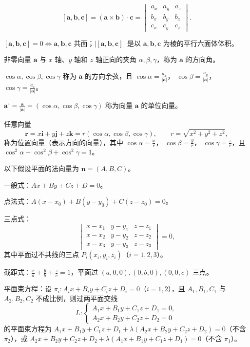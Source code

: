
\[
[\bm a,\bm b,\bm c]=(\bm a\times\bm b)\cdot\bm c
=\begin{vmatrix}
a_x&a_y&a_z\\
b_x&b_y&b_z\\
c_x&c_y&c_z
\end{vmatrix}.
\]

 $[\bm a,\bm b,\bm c]=0\Longleftrightarrow\bm a,\bm b,\bm c$ 共面；$|[\bm a,\bm b,\bm c]|$ 是以 $\bm a,\bm b,\bm c$ 为棱的平行六面体体积。


 非零向量 $\bm a$ 与 $x$ 轴、$y$ 轴和 $z$ 轴正向的夹角 $\alpha,\beta,\gamma$，称为 $\bm a$ 的方向角。

 $\cos\alpha,\cos\beta,\cos\gamma$ 称为 $\bm a$ 的方向余弦，且
$\displaystyle \cos\alpha=\frac{a_x}{|\bm a|}$，
$\displaystyle \cos\beta=\frac{a_y}{|\bm a|}$，
$\displaystyle \cos\gamma=\frac{a_z}{|\bm a|}$。

 $\displaystyle \bm a^\circ=\frac{\bm a}{|\bm a|}
=(\cos\alpha,\cos\beta,\cos\gamma)$ 称为向量 $\bm a$ 的单位向量。

 任意向量
\[
\bm r=x\bm i+y\bm j+z\bm k
=r(\cos\alpha,\cos\beta,\cos\gamma),
\qquad r=\sqrt{x^2+y^2+z^2},
\]
称为位置向量（表示方向的向量），其中
$\displaystyle \cos\alpha=\frac{x}{r}$，
$\displaystyle \cos\beta=\frac{y}{r}$，
$\displaystyle \cos\gamma=\frac{z}{r}$，且
$\cos^2\alpha+\cos^2\beta+\cos^2\gamma=1$。



以下假设平面的法向量为 $\bm n=(A,B,C)$。

 一般式：$Ax+By+Cz+D=0$。

 点法式：$A(x-x_0)+B(y-y_0)+C(z-z_0)=0$。

 三点式：
\[
\begin{vmatrix}
x-x_1&y-y_1&z-z_1\\
x-x_2&y-y_2&z-z_2\\
x-x_3&y-y_3&z-z_3
\end{vmatrix}=0,
\]
其中平面过不共线的三点 $P_i(x_i,y_i,z_i)$（$i=1,2,3$）。

 截距式：$\displaystyle \frac{x}{a}+\frac{y}{b}+\frac{z}{c}=1$，平面过 $(a,0,0),(0,b,0),(0,0,c)$ 三点。

 平面束方程：设
$\pi_i:A_ix+B_iy+C_iz+D_i=0$（$i=1,2$），且
$A_1,B_1,C_1$ 与 $A_2,B_2,C_2$ 不成比例，则过两平面交线
\[
L:\begin{cases}
A_1x+B_1y+C_1z+D_1=0,\\
A_2x+B_2y+C_2z+D_2=0
\end{cases}
\]
的平面束方程为
$A_1x+B_1y+C_1z+D_1+\lambda(A_2x+B_2y+C_2z+D_2)=0$（不含 $\pi_2$），或
$A_2x+B_2y+C_2z+D_2+\lambda(A_1x+B_1y+C_1z+D_1)=0$（不含 $\pi_1$）。

